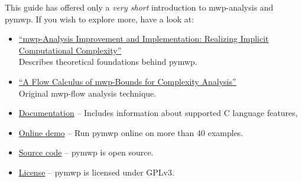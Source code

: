 This guide has offered only a \emph{very short} introduction to mwp-analysis and pymwp.
If you wish to explore more, have a look at:

\begin{itemize}

\item \href{https://doi.org/10.4230/LIPIcs.FSCD.2022.26}
{\enquote{mwp-Analysis Improvement and Implementation: Realizing Implicit Computational Complexity}}\\
Describes theoretical foundations behind pymwp.

\item \href{https://doi.org/10.1145/1555746.1555752}
{\enquote{A Flow Calculus of mwp-Bounds for Complexity Analysis}}\\
Original mwp-flow analysis technique.

\item \href{https://statycc.github.io/pymwp}{Documentation} -- Includes information about supported C language features, \etc

\item \href{https://statycc.github.io/pymwp/demo/}{Online demo} -- Run pymwp online on more than 40 examples.

\item \href{https://github.com/statycc/pymwp}{Source code} -- pymwp is open source.

\item \href{https://github.com/statycc/pymwp/blob/main/LICENSE}{License} -- pymwp is licensed under GPLv3.

\end{itemize}